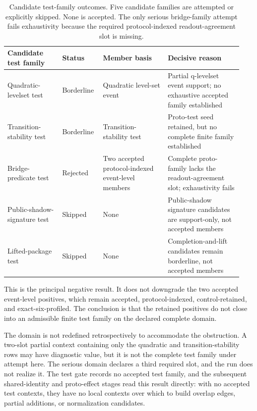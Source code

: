 \documentclass[11pt]{article}
\theoremstyle{definition}
\begin{document}
\begin{table}[t]
\centering
\small
\setlength{\tabcolsep}{4pt}
\begin{tabular}{p{0.22\linewidth}p{0.16\linewidth}p{0.26\linewidth}p{0.30\linewidth}}
\hline
\textbf{Candidate test family} & \textbf{Status} & \textbf{Member basis} & \textbf{Decisive reason} \\
\hline
Quadratic-levelset test
&
Borderline
&
Quadratic level-set event
&
Partial q-levelset event support; no exhaustive accepted family established
\\[0.4em]
Transition-stability test
&
Borderline
&
Transition-stability test
&
Proto-test seed retained, but no complete finite family established
\\[0.4em]
Bridge-predicate test
&
Rejected
&
Two accepted protocol-indexed event-level members
&
Complete proto-family lacks the readout-agreement slot; exhaustivity fails
\\[0.4em]
Public-shadow-signature test
&
Skipped
&
None
&
Public-shadow signature candidates are support-only, not accepted members
\\[0.4em]
Lifted-package test
&
Skipped
&
None
&
Completion-and-lift candidates remain borderline, not accepted members
\\
\hline
\end{tabular}
\caption{Candidate test-family outcomes. Five candidate families are attempted or explicitly skipped. None is accepted. The only serious bridge-family attempt fails exhaustivity because the required protocol-indexed readout-agreement slot is missing.}
\label{tab:candidate-test-outcomes}
\end{table}

This is the principal negative result. It does not downgrade the two accepted event-level positives, which remain accepted, protocol-indexed, control-retained, and exact-six-profiled. The conclusion is that the retained positives do not close into an admissible finite test family on the declared complete domain.

The domain is not redefined retrospectively to accommodate the obstruction. A two-slot partial context containing only the quadratic and transition-stability rows may have diagnostic value, but it is not the complete test family under attempt here. The serious domain declares a third required slot, and the run does not realize it. The test gate records no accepted test family, and the subsequent shared-identity and proto-effect stages read this result directly: with no accepted test contexts, they have no local contexts over which to build overlap edges, partial additions, or normalization candidates.
\end{document}

